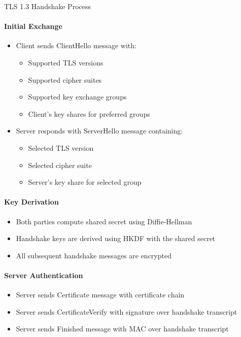 \begin{KR}{TLS 1.3 Handshake Process}
\paragraph{Initial Exchange}
\begin{itemize}
    \item Client sends ClientHello message with:
    \begin{itemize}
        \item Supported TLS versions
        \item Supported cipher suites
        \item Supported key exchange groups
        \item Client's key shares for preferred groups
    \end{itemize}
    \item Server responds with ServerHello message containing:
    \begin{itemize}
        \item Selected TLS version
        \item Selected cipher suite
        \item Server's key share for selected group
    \end{itemize}
\end{itemize}

\paragraph{Key Derivation}
\begin{itemize}
    \item Both parties compute shared secret using Diffie-Hellman
    \item Handshake keys are derived using HKDF with the shared secret
    \item All subsequent handshake messages are encrypted
\end{itemize}

\paragraph{Server Authentication}
\begin{itemize}
    \item Server sends Certificate message with certificate chain
    \item Server sends CertificateVerify with signature over handshake transcript
    \item Server sends Finished message with MAC over handshake transcript
\end{itemize}


\end{KR}
